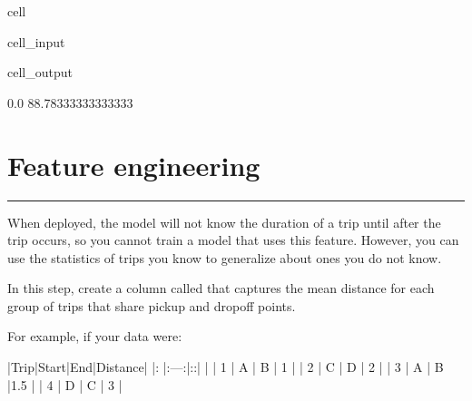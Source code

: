 \documentclass[letterpaper,10pt,english]{sphinxmanual}
\begin{document}
\begin{sphinxuseclass}{cell}
\begin{sphinxuseclass}{cell_input}
\begin{sphinxVerbatim}[commandchars=\\\{\}]
\PYG{p}{[}\PYG{p}{]}
\PYG{p}{[}\PYG{p}{]}
\end{sphinxVerbatim}

\end{sphinxuseclass}
\begin{sphinxuseclass}{cell_output}
\begin{sphinxVerbatim}[commandchars=\\\{\}]
0.0
88.78333333333333
\end{sphinxVerbatim}

\end{sphinxuseclass}
\end{sphinxuseclass}

\section{Feature engineering}
\label{\detokenize{Automatidata_Regression Analysis:feature-engineering}}

\bigskip\hrule\bigskip


\sphinxAtStartPar
{}

\sphinxAtStartPar
When deployed, the model will not know the duration of a trip until after the trip occurs, so you cannot train a model that uses this feature. However, you can use the statistics of trips you  know to generalize about ones you do not know.

\sphinxAtStartPar
In this step, create a column called  that captures the mean distance for each group of trips that share pickup and dropoff points.

\sphinxAtStartPar
For example, if your data were:

\sphinxAtStartPar
|Trip|Start|End|Distance|
|\textendash{}: |:—:|:\sphinxhyphen{}:|    |
| 1  | A   | B | 1  |
| 2  | C   | D | 2  |
| 3  | A   | B |1.5 |
| 4  | D   | C | 3  |
\end{document}
